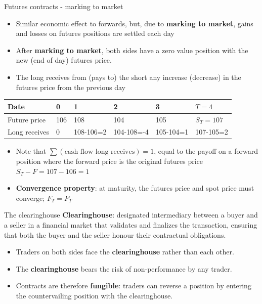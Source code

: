 \documentclass[
  ignorenonframetext,
  aspectratio=169]{beamer}
\providecommand{\tightlist}{%
  \setlength{\itemsep}{0pt}\setlength{\parskip}{0pt}}
\begin{document}
\begin{frame}{Futures contracts - marking to market}
\protect\hypertarget{futures-contracts---marking-to-market}{}
\begin{itemize}
\item
  Similar economic effect to forwards, but, due to \textbf{marking to
  market}, gains and losses on futures positions are settled each day
\item
  After \textbf{marking to market}, both sides have a zero value
  position with the new (end of day) futures price.
\item
  The long receives from (pays to) the short any increase (decrease) in
  the futures price from the previous day
\end{itemize}

\begin{longtable}[]{@{}llllll@{}}
\toprule
Date & 0 & 1 & 2 & 3 & \(T=4\) \\
\midrule
\endhead
Future price & 106 & 108 & 104 & 105 & \(S_T=107\) \\
Long receives & 0 & 108-106=2 & 104-108=-4 & 105-104=1 & 107-105=2 \\
\bottomrule
\end{longtable}

\begin{itemize}
\tightlist
\item
  Note that \(\sum(\text{cash flow long receives}) = 1\), equal to the
  payoff on a forward position where the forward price is the original
  futures price \(S_T - F = 107-106 = 1\)
\item
  \textbf{Convergence property}: at maturity, the futures price and spot
  price must converge; \(F_T=P_T\)
\end{itemize}
\end{frame}

\begin{frame}{The clearinghouse}
\protect\hypertarget{the-clearinghouse}{}
\textbf{Clearinghouse}: designated intermediary between a buyer and a
seller in a financial market that validates and finalizes the
transaction, ensuring that both the buyer and the seller honour their
contractual obligations.

\begin{itemize}
\tightlist
\item
  Traders on both sides face the \textbf{clearinghouse} rather than each
  other.
\item
  The \textbf{clearinghouse} bears the risk of non-performance by any
  trader.
\item
  Contracts are therefore \textbf{fungible}: traders can reverse a
  position by entering the countervailing position with the
  clearinghouse.
\end{itemize}
\end{frame}
\end{document}
